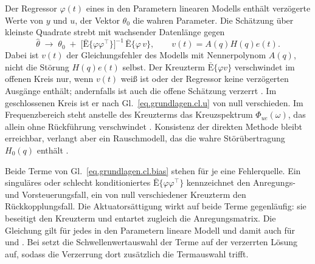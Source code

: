 Der Regressor $\varphi(t)$ eines in den Parametern linearen Modells
enthält verzögerte Werte von $y$ und $u$, der Vektor $\theta_0$ die
wahren Parameter. Die Schätzung über kleinste Quadrate strebt mit
wachsender Datenlänge gegen
\begin{equation}
  \label{eq.grundlagen.cl.bias}
  \hat{\theta} \;\longrightarrow\; \theta_0 \;+\;
  \bigl[\bar{\mathrm{E}}\{\varphi\varphi^{\top}\}\bigr]^{-1}\,
  \bar{\mathrm{E}}\{\varphi\,v\}, \qquad v(t) = A(q)H(q)e(t).
\end{equation}
Dabei ist $v(t)$ der Gleichungsfehler des Modells mit Nennerpolynom
$A(q)$, nicht die Störung $H(q)e(t)$ selbst.
Der Kreuzterm $\bar{\mathrm{E}}\{\varphi v\}$ verschwindet im offenen
Kreis nur, wenn $v(t)$ weiß ist oder der Regressor keine verzögerten
Ausgänge enthält; andernfalls ist auch die offene Schätzung verzerrt
\cite[Kap.~8]{ljungSystemIdentificationTheory1999}. Im geschlossenen
Kreis ist er nach Gl.~\eqref{eq.grundlagen.cl.u} von null verschieden.
Im Frequenzbereich steht anstelle des Kreuzterms das Kreuzspektrum
$\Phi_{ue}(\omega)$, das allein ohne Rückführung verschwindet
\cite{forssellClosedloopIdenticationRevisited1999}. Konsistenz der
direkten Methode bleibt erreichbar, verlangt aber ein Rauschmodell, das
die wahre Störübertragung $H_0(q)$ enthält
\cite{gustavssonIdentificationProcessesClosed1977,%
ljungSystemIdentificationTheory1999}.

Beide Terme von Gl.~\eqref{eq.grundlagen.cl.bias} stehen für je eine
Fehlerquelle. Ein singuläres oder schlecht konditioniertes
$\bar{\mathrm{E}}\{\varphi\varphi^{\top}\}$ kennzeichnet den Anregungs-
und Vorsteuerungsfall, ein von null verschiedener Kreuzterm den
Rückkopplungsfall. Die Aktuatorsättigung wirkt auf beide Terme
gegenläufig: sie beseitigt den Kreuzterm und entartet zugleich die
Anregungsmatrix. Die Gleichung gilt für jedes in den Parametern lineare
Modell und damit auch für \sindyc und \edmdc. Bei \sindyc setzt die
Schwellenwertauswahl der Terme auf der verzerrten Lösung auf, sodass die
Verzerrung dort zusätzlich die Termauswahl trifft.

